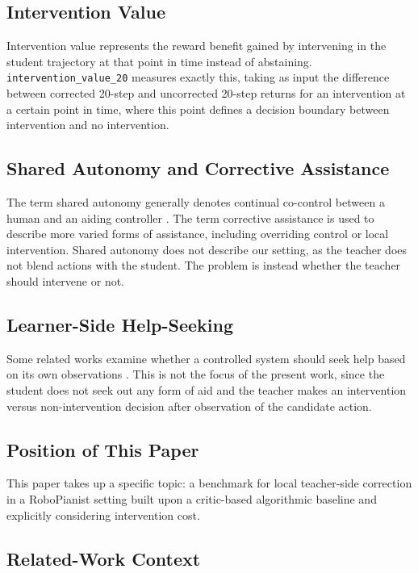 \documentclass[11pt]{article}
\begin{document}
\subsection*{Intervention Value}

Intervention value represents the reward benefit gained by intervening in the student trajectory at that point in time instead of abstaining. \texttt{intervention\_value\_20} measures exactly this, taking as input the difference between corrected 20-step and uncorrected 20-step returns for an intervention at a certain point in time, where this point defines a decision boundary between intervention and no intervention.

\subsection*{Shared Autonomy and Corrective Assistance}

The term shared autonomy generally denotes continual co-control between a human and an aiding controller \cite{reddy2018shared,schaff2020residual}. The term corrective assistance is used to describe more varied forms of assistance, including overriding control or local intervention. Shared autonomy does not describe our setting, as the teacher does not blend actions with the student. The problem is instead whether the teacher should intervene or not.

\subsection*{Learner-Side Help-Seeking}

Some related works examine whether a controlled system should seek help based on its own observations \cite{singh2022ask4help,ren2023robots}. This is not the focus of the present work, since the student does not seek out any form of aid and the teacher makes an intervention versus non-intervention decision after observation of the candidate action.

\subsection*{Position of This Paper}

This paper takes up a specific topic: a benchmark for local teacher-side correction in a RoboPianist setting built upon a critic-based algorithmic baseline and explicitly considering intervention cost.

\subsection*{Related-Work Context}
\end{document}
